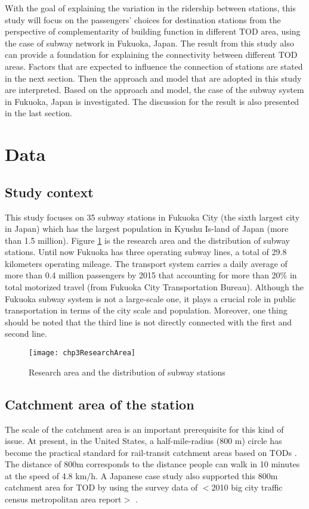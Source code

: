 %
With the goal of explaining the variation in the ridership between stations, this study will focus on the passengers’ choices for destination stations from the perspective of complementarity of building function in different TOD area, using the case of subway network in Fukuoka, Japan. The result from this study also can provide a foundation for explaining the connectivity between different TOD areas. Factors that are expected to influence the connection of stations are stated in the next section. Then the approach and model that are adopted in this study are interpreted. Based on the approach and model, the case of the subway system in Fukuoka, Japan is investigated. The discussion for the result is also presented in the last section.

%
\section{Data}

%
\subsection{Study context}
%
This study focuses on 35 subway stations in Fukuoka City (the sixth largest city in Japan) which has the largest population in Kyushu Is-land of Japan (more than 1.5 million). Figure \ref{fig:chp3:ResearchArea} is the research area and the distribution of subway stations. Until now Fukuoka has three operating subway lines, a total of 29.8 kilometers operating mileage. The transport system carries a daily average of more than 0.4 million passengers by 2015 that accounting for more than 20\% in total motorized travel (from Fukuoka City Transportation Bureau). Although the Fukuoka subway system is not a large-scale one, it plays a crucial role in public transportation in terms of the city scale and population. Moreover, one thing should be noted that the third line is not directly connected with the first and second line.

\begin{figure}[htbp]
	\centering
	\texttt{[image: chp3ResearchArea]}
	\caption{Research area and the distribution of subway stations}
	\label{fig:chp3:ResearchArea}
\end{figure}

%
\subsection{Catchment area of the station}
%
The scale of the catchment area is an important prerequisite for this kind of issue. At present, in the United States, a half-mile-radius (800 m) circle has become the practical standard for rail-transit catchment areas based on TODs \cite{guerra2013half}. The distance of 800m corresponds to the distance people can walk in 10 minutes at the speed of 4.8 km/h. A Japanese case study also supported this 800m catchment area for TOD by using the survey data of $<$2010 big city traffic census metropolitan area report$>$ \cite{tadakatsu2015an}.

